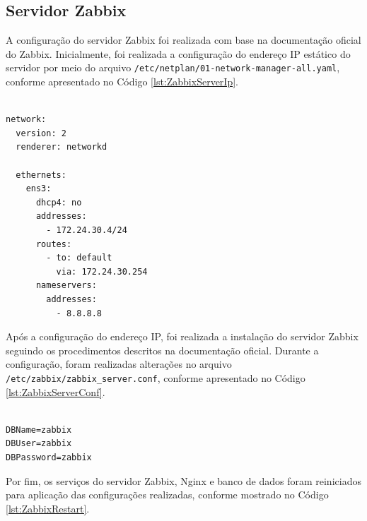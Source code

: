 \subsection{Servidor Zabbix}

A configuração do servidor Zabbix foi realizada com base na documentação oficial do Zabbix\cite{zabbix_install}. Inicialmente, foi realizada a configuração do endereço IP estático do servidor por meio do arquivo \texttt{/etc/netplan/01-network-manager-all.yaml}, conforme apresentado no Código \ref{lst:ZabbixServerIp}.

\begin{listing}[H]
\centering
\begin{verbatim}

network:
  version: 2
  renderer: networkd

  ethernets:
    ens3:
      dhcp4: no
      addresses:
        - 172.24.30.4/24
      routes:
        - to: default
          via: 172.24.30.254
      nameservers:
        addresses:
          - 8.8.8.8

\end{verbatim}
\caption{Configuração do IP - Servidor Zabbix}
\label{lst:ZabbixServerIp}
\end{listing}

Após a configuração do endereço IP, foi realizada a instalação do servidor Zabbix seguindo os procedimentos descritos na documentação oficial. Durante a configuração, foram realizadas alterações no arquivo \texttt{/etc/zabbix/zabbix\_server.conf}, conforme apresentado no Código \ref{lst:ZabbixServerConf}.

\begin{listing}[H]
\centering
\begin{verbatim}

DBName=zabbix
DBUser=zabbix
DBPassword=zabbix

\end{verbatim}
\caption{Configuração do arquivo zabbix\_server.conf}
\label{lst:ZabbixServerConf}
\end{listing}

Por fim, os serviços do servidor Zabbix, Nginx e banco de dados foram reiniciados para aplicação das configurações realizadas, conforme mostrado no Código \ref{lst:ZabbixRestart}.

